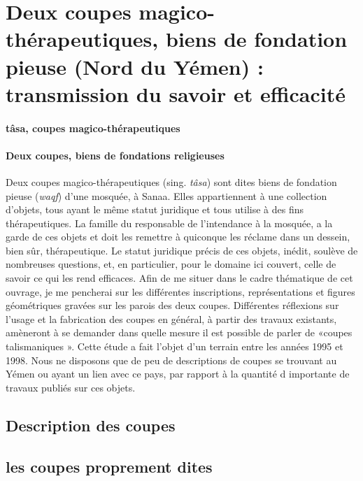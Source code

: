  



 
\section{Deux coupes magico-thérapeutiques, biens de fondation pieuse (Nord du Yémen) : transmission du savoir et efficacité}

\paragraph{tâsa, coupes magico-thérapeutiques}
 \paragraph{Deux coupes, biens de fondations religieuses}
Deux coupes magico-thérapeutiques (sing. \textit{tâsa}) sont dites biens de fondation pieuse ({\textit{waqf}}) d'une mosquée, à Sanaa. Elles appartiennent à une collection d'objets, tous ayant le même statut juridique et tous utilise à des fins thérapeutiques. La famille du responsable de l'intendance à la mosquée, a la garde de ces objets et doit les remettre à quiconque les réclame dans un dessein, bien sûr, thérapeutique. Le statut juridique précis de ces objets, inédit, soulève de nombreuses questions, et, en particulier, pour le domaine ici couvert, celle de savoir ce qui les rend efficaces.
Afin de me situer dans le cadre thématique de cet ouvrage, je me pencherai sur les différentes inscriptions, représentations et figures géométriques gravées sur les parois des deux coupes. Différentes réflexions sur l'usage et la fabrication des coupes en général, à partir des travaux existants, amèneront à se demander dans quelle mesure il est possible de parler de «coupes talismaniques ».
Cette étude a fait l'objet d'un terrain entre les années 1995 et 1998.
Nous ne disposons que de peu de descriptions de coupes se trouvant au Yémen ou ayant un lien avec ce pays, par rapport à la quantité d importante de travaux publiés sur ces objets.
\subsection{Description des coupes}


\subsection{les coupes proprement dites}

